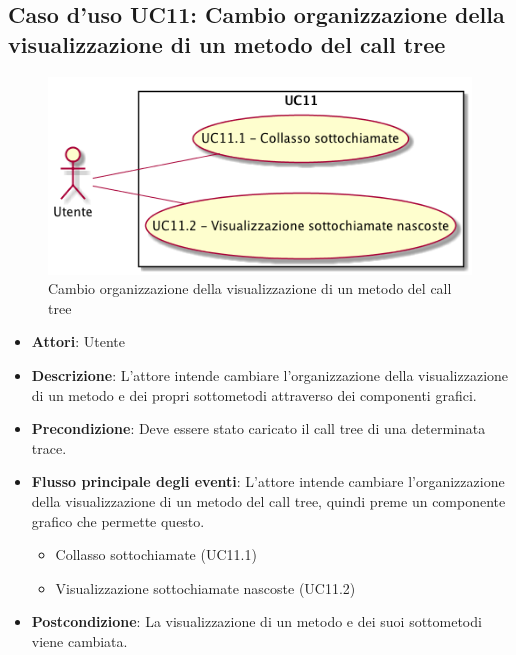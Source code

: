 \subsection{Caso d'uso UC11: Cambio organizzazione della visualizzazione di un metodo del call tree}
\begin{figure} [H]
	\centering
	\includegraphics[scale=0.45]{./UC/UC11.png}
	\caption{Cambio organizzazione della visualizzazione di un metodo del call tree}\label{}
\end{figure}
\begin{itemize}
	\item \textbf{Attori}: Utente
	\item \textbf{Descrizione}: L'attore intende cambiare l'organizzazione della visualizzazione di un metodo e dei propri sottometodi attraverso dei componenti grafici.
	
	\item \textbf{Precondizione}: Deve essere stato caricato il call tree di una determinata trace.
	\item \textbf{Flusso principale degli eventi}: L'attore intende cambiare l'organizzazione della visualizzazione di un metodo del call tree, quindi preme un componente grafico che permette questo.
	\begin{itemize}
		\item Collasso sottochiamate (UC11.1)
		\item Visualizzazione sottochiamate nascoste (UC11.2)
	\end{itemize}
	\item \textbf{Postcondizione}: La visualizzazione di un metodo e dei suoi sottometodi viene cambiata.
\end{itemize}
